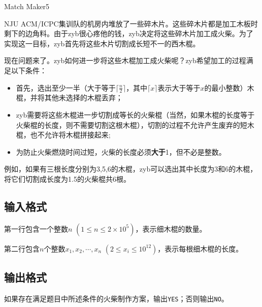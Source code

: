 \begin{Problem}{Match Maker}{5}

NJU ACM/ICPC集训队的机房内堆放了一些碎木片。这些碎木片都是加工木板时剩下的边角料。由于zyb很心疼他的钱，zyb决定将这些碎木片加工成火柴。为了实现这一目标，zyb首先将这些木片切割成长短不一的西木棍。

现在问题来了。zyb如何进一步将这些木棍加工成火柴呢？zyb希望加工的过程满足以下条件：

\begin{itemize}
\item 首先，选出至少一半（大于等于$\lceil \frac{n}{2} \rceil$，其中$\lceil x \rceil$表示大于等于$x$的最小整数）木棍，并将其他未选择的木棍丢弃；
\item zyb需要将这些木棍进一步切割成等长的火柴棍（当然，如果木棍的长度等于火柴棍的长度，则不需要切割这根木棍），切割的过程不允许产生废弃的短木棍，也不允许将木棍拼接起来;
\item 为防止火柴燃烧时间过短，火柴的长度必须\textbf{大于}1，但不必是整数。
\end{itemize}

例如，如果有三根长度分别为3,5,6的木棍，zyb可以选出其中长度为3和6的木棍，将它们切割成长度为1.5的火柴棍共6根。

\subsection*{输入格式}

第一行包含一个整数$n$ $(1 \leq n \leq 2 \times 10^5)$，表示细木棍的数量。

第二行包含$n$个整数$x_1, x_2, \cdots, x_n$ $(2 \leq x_i \leq 10^{12})$，表示每根细木棍的长度。

\subsection*{输出格式}

如果存在满足题目中所述条件的火柴制作方案，输出\texttt{YES}；否则输出\texttt{NO}。


\end{Problem}

